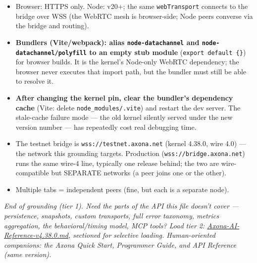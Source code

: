 \documentclass[
  nobib]{tufte-handout}
\providecommand{\tightlist}{%
  \setlength{\itemsep}{0pt}\setlength{\parskip}{0pt}}
\begin{document}
\begin{itemize}
\tightlist
\item
  Browser: HTTPS only. Node: v20+; the same \texttt{webTransport}
  connects to the bridge over WSS (the WebRTC mesh is browser-side; Node
  peers converse via the bridge and routing).
\item
  \textbf{Bundlers (Vite/webpack): alias \texttt{node-datachannel} and
  \texttt{node-datachannel/polyfill} to an empty stub module}
  (\texttt{export\ default\ \{\}}) for browser builds. It is the
  kernel's Node-only WebRTC dependency; the browser never executes that
  import path, but the bundler must still be able to resolve it.
\item
  \textbf{After changing the kernel pin, clear the bundler's dependency
  cache} (Vite: delete \texttt{node\_modules/.vite}) and restart the dev
  server. The stale-cache failure mode --- the old kernel silently
  served under the new version number --- has repeatedly cost real
  debugging time.
\item
  The testnet bridge is \texttt{wss://testnet.axona.net} (kernel 4.38.0,
  wire 4.0) --- the network this grounding targets. Production
  (\texttt{wss://bridge.axona.net}) runs the same wire-4 line, typically
  one release behind; the two are wire-compatible but SEPARATE networks
  (a peer joins one or the other).
\item
  Multiple tabs = independent peers (fine, but each is a separate node).
\end{itemize}

\emph{End of grounding (tier 1). Need the parts of the API this file
doesn't cover --- persistence, snapshots, custom transports, full error
taxonomy, metrics aggregation, the behavioral/timing model, MCP tools?
Load tier 2: \url{Axona-AI-Reference-v4.38.0.md}, sectioned for
selective loading. Human-oriented companions: the Axona Quick Start,
Programmer Guide, and API Reference (same version).}
\end{document}
